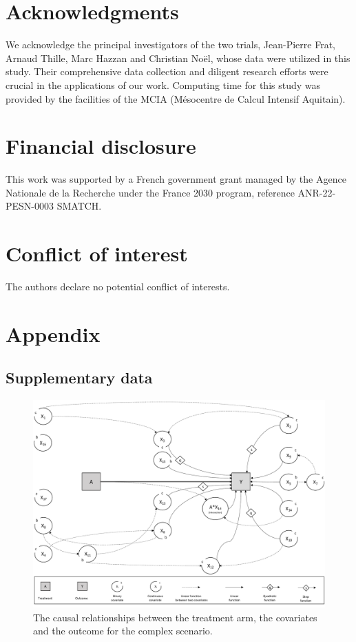 \documentclass{article}
\begin{document}
\section*{Acknowledgments}
We acknowledge the principal investigators of the two trials, Jean-Pierre Frat, Arnaud Thille, Marc Hazzan and Christian Noël, whose data were utilized in this study. Their comprehensive data collection and diligent research efforts were crucial in the applications of our work. Computing time for this study was provided by the facilities of the MCIA (Mésocentre de Calcul Intensif Aquitain).

\section*{Financial disclosure}
This work was supported by a French government grant managed by the Agence Nationale de la Recherche under the France 2030 program, reference ANR-22-PESN-0003 SMATCH.

\section*{Conflict of interest}
The authors declare no potential conflict of interests.




\clearpage


\section*{Appendix}


\subsection*{Supplementary data}


\begin{figure}[h]
\centerline{\includegraphics[width=\textwidth]{figures/DAGcomplexe.pdf}}
\caption{The causal relationships between the treatment arm, the covariates and the outcome for the complex scenario.\label{fig1}}
\end{figure}
\end{document}
